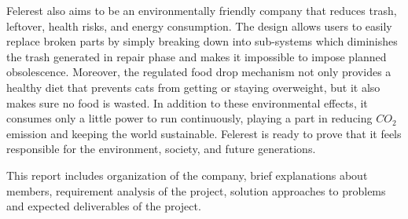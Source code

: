 Felerest also aims to be an environmentally friendly company that reduces trash, leftover, health risks, and energy consumption. The design allows users to easily replace broken parts by simply breaking down into sub-systems which diminishes the trash generated in repair phase and makes it impossible to impose planned obsolescence. Moreover, the regulated food drop mechanism not only provides a healthy diet that prevents cats from getting or staying overweight, but it also makes sure no food is wasted. In addition to these environmental effects, it consumes only a little power to run continuously, playing a part in reducing $CO_2$ emission and keeping the world sustainable. Felerest is ready to prove that it feels responsible for the environment, society, and future generations.

This report includes organization of the company, brief explanations about members, requirement analysis of the project, solution approaches to problems and expected deliverables of the project. 

